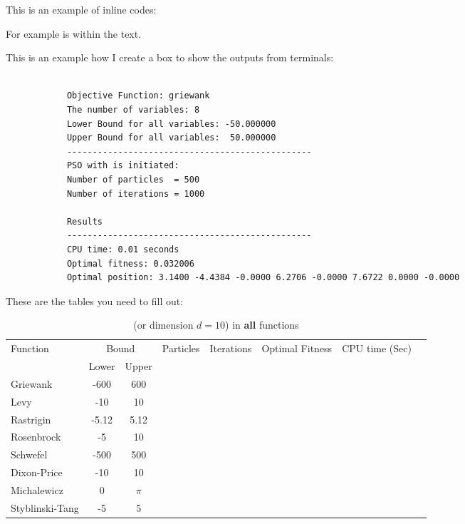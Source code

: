 \documentclass[12pt]{article}
\begin{document}
	
	
	
	
	This is an example of inline codes:
	
	{\scriptsize {}}
	
	
	For example  is within the text.
	
	This is an example how I create a box to show the outputs from terminals:
	
	\begin{mdframed}[style=myboxstyleTerminal1]
		\footnotesize
		\begin{verbatim}
			
			Objective Function: griewank
			The number of variables: 8
			Lower Bound for all variables: -50.000000
			Upper Bound for all variables:  50.000000
			------------------------------------------------
			PSO with is initiated:
			Number of particles  = 500
			Number of iterations = 1000 
			
			Results
			------------------------------------------------
			CPU time: 0.01 seconds
			Optimal fitness: 0.032006
			Optimal position: 3.1400 -4.4384 -0.0000 6.2706 -0.0000 7.6722 0.0000 -0.0000
		\end{verbatim}
	\end{mdframed}
	
	These are the tables you need to fill out:
	
	\begin{table}[H]
		\caption{ (or dimension $d=10$) in \textbf{all} functions}
		\label{table:1}
		\centering
		\begin{tabular}{l c c c c c c c}
			\hline
			Function &  \multicolumn{2}{c}{Bound} & Particles & Iterations &  Optimal Fitness & CPU time (Sec) \\
			& Lower& Upper&&&\\
			\hline
			Griewank  		&  -600   & 600 	& & & & &\\
			Levy 	  		&  -10    & 10 		& & & & &\\
			Rastrigin 		&  -5.12  & 5.12 	& & & & &\\
			Rosenbrock		&  -5     & 10 		& & & & &\\
			Schwefel 	 	&  -500   & 500 	& & & & &\\
			Dixon-Price 	&   -10	  & 10 		& & & & &\\
			Michalewicz 	&   0 	  & $\pi$ 	& & & & &\\
			Styblinski-Tang & -5 	  & 5  		& & & & &\\
			\hline
		\end{tabular}
	\end{table}
	
\end{document}
